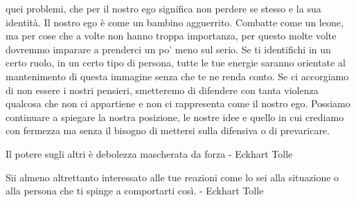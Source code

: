 \documentclass[12pt]{book} %
\begin{document}
quei problemi, che per il nostro ego significa non perdere se stesso e la sua identità. Il nostro ego è come un bambino
agguerrito. Combatte come un leone, ma per cose che a volte non hanno troppa importanza, per questo molte volte
dovremmo imparare a prenderci un po' meno sul serio. Se ti identifichi in un certo ruolo, in un
certo tipo di persona, tutte le tue energie saranno orientate al mantenimento di questa immagine senza che te ne renda
conto. Se ci accorgiamo di non essere i nostri pensieri, smetteremo di difendere con tanta violenza qualcosa che non ci
appartiene e non ci rappresenta come il nostro ego. Possiamo continuare a spiegare la nostra posizione, le nostre idee
e quello in cui crediamo con fermezza ma senza il bisogno di mettersi sulla difensiva o di prevaricare.

Il potere sugli altri è debolezza mascherata da forza - Eckhart Tolle

Sii almeno altrettanto interessato alle tue reazioni come lo sei alla situazione o alla persona che ti spinge a
comportarti così. - Eckhart Tolle
\end{document}
